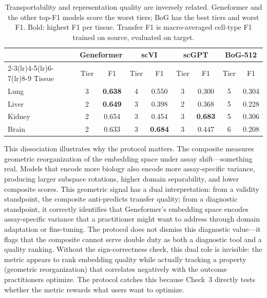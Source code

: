 \documentclass[10pt,letterpaper]{article}
\begin{document}
\begin{table}[t]
\centering
\caption{Transportability and representation quality are inversely related. Geneformer and the other top-F1 models score the worst tiers; BoG has the best tiers and worst F1. Bold: highest F1 per tissue. Transfer F1 is macro-averaged cell-type F1 trained on source, evaluated on target.}
\label{tab:dissociation}
\small
\begin{tabular}{@{}lcccccccc@{}}
\toprule
 & \multicolumn{2}{c}{Geneformer} & \multicolumn{2}{c}{scVI} & \multicolumn{2}{c}{scGPT} & \multicolumn{2}{c}{BoG-512} \\
\cmidrule(lr){2-3}\cmidrule(lr){4-5}\cmidrule(lr){6-7}\cmidrule(lr){8-9}
Tissue & Tier & F1 & Tier & F1 & Tier & F1 & Tier & F1 \\
\midrule
Lung   & 3 & \textbf{0.638} & 4 & 0.550 & 3 & 0.300 & 5 & 0.304 \\
Liver  & 2 & \textbf{0.649} & 3 & 0.398 & 2 & 0.368 & 5 & 0.228 \\
Kidney & 2 & 0.654 & 3 & 0.454 & 3 & \textbf{0.683} & 5 & 0.306 \\
Brain  & 2 & 0.633 & 3 & \textbf{0.684} & 3 & 0.447 & 6 & 0.208 \\
\bottomrule
\end{tabular}
\end{table}

This dissociation illustrates why the protocol matters. The composite measures geometric reorganization of the embedding space under assay shift---something real. Models that encode more biology also encode more assay-specific variance, producing larger subspace rotations, higher domain separability, and lower composite scores. This geometric signal has a dual interpretation: from a validity standpoint, the composite anti-predicts transfer quality; from a diagnostic standpoint, it correctly identifies that Geneformer's embedding space encodes assay-specific variance that a practitioner might want to address through domain adaptation or fine-tuning. The protocol does not dismiss this diagnostic value---it flags that the composite cannot serve double duty as both a diagnostic tool and a quality ranking. Without the sign-correctness check, this dual role is invisible: the metric appears to rank embedding quality while actually tracking a property (geometric reorganization) that correlates negatively with the outcome practitioners optimize. The protocol catches this because Check~3 directly tests whether the metric rewards what users want to optimize.
\end{document}
